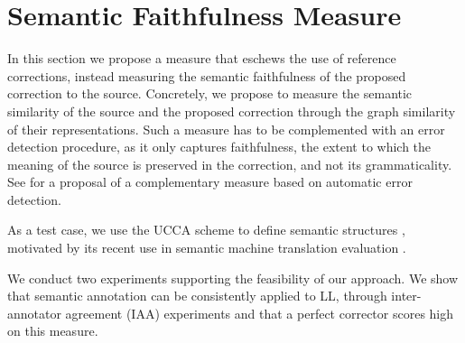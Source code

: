 \documentclass[letterpaper, 11pt]{article}
\begin{document}
\section{Semantic Faithfulness Measure}\label{sec:Semantics}
%
%
%
%

In this section we propose a measure that eschews the use
of reference corrections, instead measuring the semantic faithfulness of the proposed
correction to the source.
Concretely, we propose to measure the semantic similarity of the source and the proposed correction
through the graph similarity of their representations.
Such a measure has to be complemented with an
error detection procedure, as it only captures faithfulness, the extent to which
the meaning of the source is preserved in the correction,
and not its grammaticality.
See 
for a proposal of a complementary measure based
on automatic error detection.

As a test case, we use the UCCA scheme to define semantic structures \cite{abend2013universal},
motivated by its recent use in semantic machine translation evaluation \cite{birch2016hume}.

We conduct two experiments supporting the feasibility of our approach.
We show that semantic annotation can be consistently applied to LL,
through inter-annotator agreement (IAA) experiments and that a perfect corrector scores high on this measure.
\end{document}
